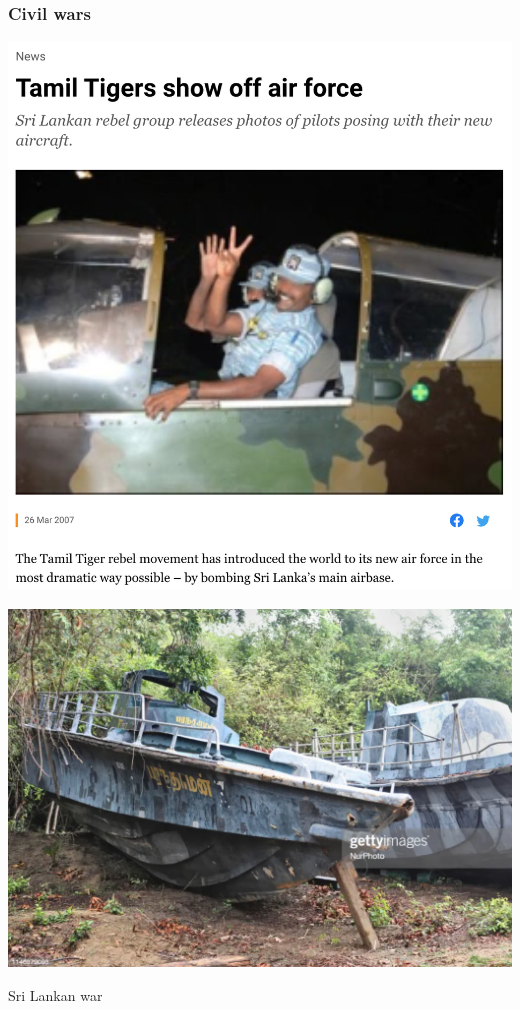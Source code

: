 \documentclass[utf8, xcolor=dvipsnames]{beamer}
\begin{document}
\begin{frame}
\frametitle{Civil wars}
\centering

\begin{minipage}{0.49\textwidth}\centering
\includegraphics[width = \textwidth]{img/tigers}
\end{minipage}\hfill
\begin{minipage}{0.49\textwidth}\centering
\includegraphics[width = \textwidth]{img/tigersnavy}
\end{minipage}

Sri Lankan war

\end{frame}
\end{document}
